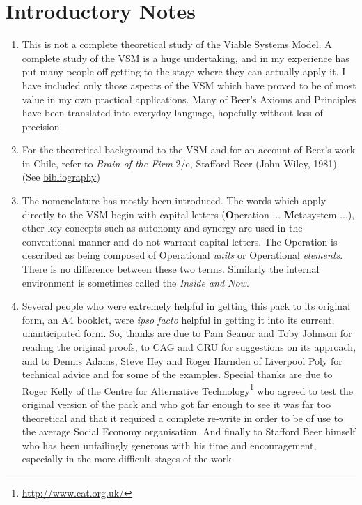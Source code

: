 \section*{Introductory Notes}
\begin{enumerate}
  \item This is not a complete theoretical study of the Viable Systems Model. A complete study of the VSM is a huge undertaking, and in my experience has put many people off getting to the stage where they can actually apply it. I have included only those aspects of the VSM which have proved to be of most value in my own practical applications. Many of Beer's Axioms and Principles have been translated into everyday language, hopefully without loss of precision.

  \item For the theoretical background to the VSM and for an account of Beer's work in Chile, refer to \textit{Brain of the Firm} 2/e, Stafford Beer (John Wiley, 1981). (See \hyperref[BIBLIOGRAPHY]{bibliography})

  \item The nomenclature has mostly been introduced. The words which apply directly to the VSM begin with capital letters (\textbf{O}peration ... \textbf{M}etasystem ...), other key concepts such as autonomy and synergy are used in the conventional manner and do not warrant capital letters. The Operation is described as being composed of Operational \textit{units} or Operational \textit{elements}. There is no difference between these two terms. Similarly the internal environment is sometimes called the \textit{Inside and Now}.

  \item Several people who were extremely helpful in getting this pack to its original form, an A4 booklet, were \textit{ipso facto} helpful in getting it into its current, unanticipated form. So, thanks are due to Pam Seanor and Toby Johnson for reading the original proofs, to CAG and CRU for suggestions on its approach, and to Dennis Adams, Steve Hey and Roger Harnden of Liverpool Poly for technical advice and for some of the examples. Special thanks are due to Roger Kelly of the {Centre for Alternative Technology}\footnote{\href{http://www.cat.org.uk/}{http://www.cat.org.uk/}} who agreed to test the original version of the pack and who got far enough to see it was far too theoretical and that it required a complete re-write in order to be of use to the average Social Economy organisation. And finally to Stafford Beer himself who has been unfailingly generous with his time and encouragement, especially in the more difficult stages of the work.

\end{enumerate}


